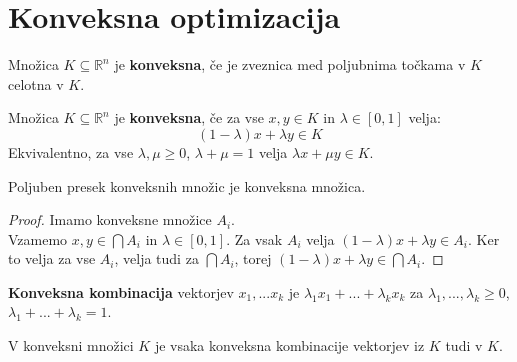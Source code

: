 \documentclass[11pt, a4paper]{article}
\begin{document}
    \pagebreak
    \section{Konveksna optimizacija}

    \begin{definition}
        Množica \(K \subseteq \mathbb{R}^n\) je \textbf{konveksna}, če je zveznica med poljubnima točkama v \(K\) celotna v \(K\).
    \end{definition}

    \begin{definition}
        Množica \(K \subseteq \mathbb{R}^n\) je \textbf{konveksna}, če za vse \(x,y \in K\) in \(\lambda \in [0,1]\) velja:
        \[
            (1-\lambda)x + \lambda y \in K    
        \]
        Ekvivalentno, za vse \(\lambda, \mu \ge 0\), \(\lambda + \mu = 1\) velja \(\lambda x + \mu y \in K\).
    \end{definition}

    \begin{proposition}
        Poljuben presek konveksnih množic je konveksna množica.
    \end{proposition}

    \begin{proof}
        Imamo konveksne množice \(A_i\). \\
        Vzamemo \(x,y \in \bigcap A_i\) in \(\lambda \in [0,1]\). Za vsak \(A_i\) velja \((1-\lambda) x + \lambda y \in A_i\). 
        Ker to velja za vse \(A_i\), velja tudi za \(\bigcap A_i\), torej \((1-\lambda) x + \lambda y \in \bigcap A_i\).
    \end{proof}

    \begin{definition}
        \textbf{Konveksna kombinacija} vektorjev \(x_1,...x_k\) je \(\lambda_1 x_1 + ... + \lambda_k x_k\) za \(\lambda_1,...,\lambda_k \ge 0\), \(\lambda_1 + ... + \lambda_k=1\).
    \end{definition}

    \begin{proposition}
        V konveksni množici \(K\) je vsaka konveksna kombinacije vektorjev iz \(K\) tudi v \(K\).
    \end{proposition}
\end{document}
